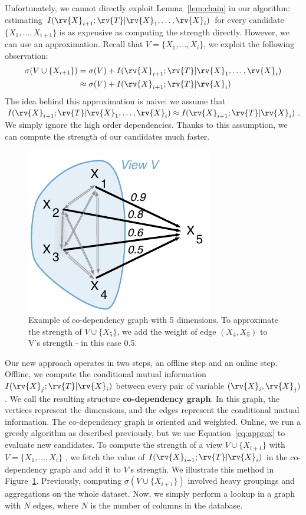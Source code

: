Unfortunately, we cannot directly exploit Lemma~\ref{lem:chain} in our
algorithm: estimating $I(\rv{X}_{i+1} ; \rv{T} | \rv{X}_1 , \ldots, \rv{X}_i)$
for every candidate $\{X_1, \ldots, X_{i+1}\}$ is as expensive as computing
the strength directly.  However, we can use an approximation.
Recall that $V = \{X_1, \ldots, X_i\}$, we exploit the following observation:
\begin{equation}\label{eq:approx}
\begin{split}
    \sigma(V \cup \{X_{i+1}\}) & = \sigma(V)   + I(\rv{X}_{i+1} ; \rv{T} |
    \rv{X}_1, \ldots, \rv{X}_{i})\\
    & \approx \sigma(V) + I(\rv{X}_{i+1} ; \rv{T} | \rv{X}_{i})
\end{split}
\end{equation}
The idea behind this approximation is naive: we assume that $I(\rv{X}_{i+1} ;
\rv{T} | \rv{X}_1, \ldots, \rv{X}_{i}) \approx I(\rv{X}_{i+1} ; \rv{T} |
\rv{X}_{i})$. We simply ignore the high order dependencies. Thanks to this
assumption, we can compute the strength of our candidates much faster. 

\begin{figure}[t!]
\centering
\includegraphics[width=0.4\columnwidth]{images/codependency}
\caption{Example of co-dependency graph with 5 dimensions. To approximate the
strength of $V \cup \{X_5\}$, we add the weight of edge $(X_4, X_5)$ to V's
strength -  in this case 0.5.}
\label{pic:codependency}
\end{figure}
Our new approach operates in two steps, an offline step and an online step.
Offline, we compute the conditional mutual information  $ I(\rv{X}_j ; \rv{T} |
\rv{X}_i)$ between every pair of variable $(\rv{X}_i, \rv{X}_j)$. We call the
resulting structure \textbf{co-dependency graph}. In this graph, the vertices
represent the dimensions, and the edges represent the conditional mutual
information. The co-dependency graph is oriented and weighted.  Online, we run
a greedy algorithm as described previously, but we use Equation~\ref{eq:approx}
to evaluate new candidates.  To compute the strength of a view $V \cup
\{X_{i+1}\}$ with  $V= \{X_1, \ldots, X_i\}$ , we fetch the value of  $
I(\rv{X}_{i+1} ; \rv{T} | \rv{X}_i)$ in the co-dependency graph and add it to
$V$'s strength. We illustrate this method in Figure~\ref{pic:codependency}.
Previously, computing $\sigma(V \cup \{X_{i+1}\})$ involved heavy groupings and
aggregations on the whole dataset.  Now, we simply perform a lookup in a graph
with $N$ edges, where $N$ is the number of columns in the database.

